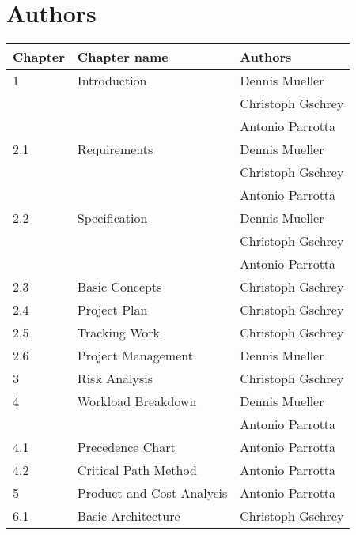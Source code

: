 \chapter*{Authors}
\begin{table}[h!]
\centering
\begin{tabular}{|l|l|l|}
\hline
\textbf{Chapter} & \textbf{Chapter name  }            & \textbf{Authors}                                            \\
\hline
1       & Introduction              & Dennis Mueller\\
	& & Christoph Gschrey\\
	&&  Antonio Parrotta \\
\hline
2.1     & Requirements              & Dennis Mueller \\
& & Christoph Gschrey\\
&&  Antonio Parrotta \\
\hline
2.2     & Specification             & Dennis Mueller\\
& & Christoph Gschrey\\
&&  Antonio Parrotta \\
\hline
2.3     & Basic Concepts            & Christoph Gschrey                                  \\
\hline
2.4     & Project Plan              & Christoph Gschrey                                  \\
\hline
2.5     & Tracking Work             & Christoph Gschrey                                  \\
\hline
2.6     & Project Management        & Dennis Mueller                                      \\
\hline
3       & Risk Analysis             & Christoph Gschrey                                  \\
\hline
4       & Workload Breakdown        & Dennis Mueller                   \\
&&  Antonio Parrotta \\
\hline
4.1     & Precedence Chart          & Antonio Parrotta                                   \\
\hline
4.2     & Critical Path Method      & Antonio Parrotta                                   \\
\hline
5       & Product and Cost Analysis & Antonio Parrotta                                   \\
\hline
6.1     & Basic Architecture        & Christoph Gschrey                                  \\

\end{tabular}
\end{table}
